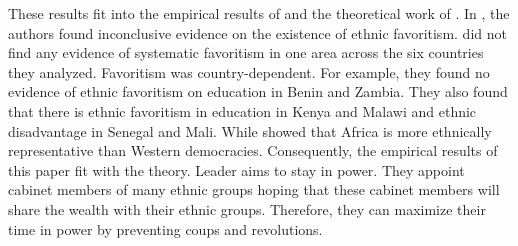 \documentclass{wptemp}
\begin{document}
These results fit into the empirical results of \citet{kramon2013benefits} and the theoretical work of \citet{francois2015power}. In \citet{kramon2013benefits}, the authors found inconclusive evidence on the existence of ethnic favoritism. \citet{kramon2013benefits} did not find any evidence of systematic favoritism in one area across the six countries they analyzed. Favoritism was country-dependent. For example, they found no evidence of ethnic favoritism on education in Benin and Zambia. They also found that there is ethnic favoritism in education in Kenya and Malawi and ethnic disadvantage in Senegal and Mali. While \citet{francois2015power} showed that Africa is more ethnically representative than Western democracies. Consequently, the empirical results of this paper fit with the theory. Leader aims to stay in power. They appoint cabinet members of many ethnic groups hoping that these cabinet members will share the wealth with their ethnic groups. Therefore, they can maximize their time in power by preventing coups and revolutions. 

\end{document}

